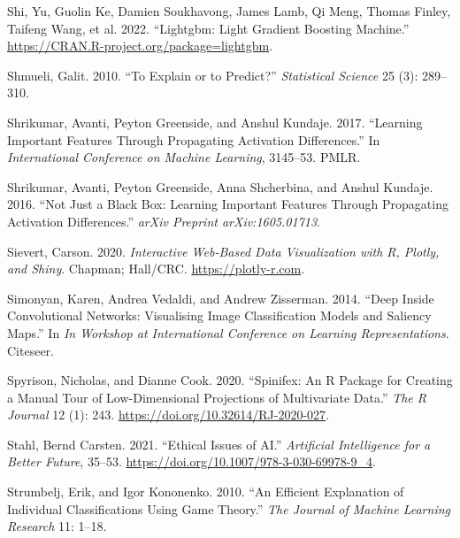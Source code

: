 \documentclass[
]{article}
\newlength{\cslhangindent}
\newlength{\cslentryspacingunit} %
\newenvironment{CSLReferences}[2] %
 {%
  \setlength{\parindent}{0pt}
  \ifodd #1
  \let\oldpar\par
  \def\par{\hangindent=\cslhangindent\oldpar}
  \fi
  \setlength{\parskip}{#2\cslentryspacingunit}
 }%
 {}
\begin{document}
\begin{CSLReferences}{1}{0}
\leavevmode{}%
Shi, Yu, Guolin Ke, Damien Soukhavong, James Lamb, Qi Meng, Thomas Finley, Taifeng Wang, et al. 2022. {``Lightgbm: {Light} {Gradient} {Boosting} {Machine}.''} \url{https://CRAN.R-project.org/package=lightgbm}.

\leavevmode{}%
Shmueli, Galit. 2010. {``To Explain or to Predict?''} \emph{Statistical Science} 25 (3): 289--310.

\leavevmode{}%
Shrikumar, Avanti, Peyton Greenside, and Anshul Kundaje. 2017. {``Learning Important Features Through Propagating Activation Differences.''} In \emph{International {Conference} on {Machine} {Learning}}, 3145--53. PMLR.

\leavevmode{}%
Shrikumar, Avanti, Peyton Greenside, Anna Shcherbina, and Anshul Kundaje. 2016. {``Not Just a Black Box: {Learning} Important Features Through Propagating Activation Differences.''} \emph{arXiv Preprint arXiv:1605.01713}.

\leavevmode{}%
Sievert, Carson. 2020. \emph{Interactive {Web}-{Based} {Data} {Visualization} with {R}, Plotly, and Shiny}. Chapman; Hall/CRC. \url{https://plotly-r.com}.

\leavevmode{}%
Simonyan, Karen, Andrea Vedaldi, and Andrew Zisserman. 2014. {``Deep Inside Convolutional Networks: {Visualising} Image Classification Models and Saliency Maps.''} In \emph{In {Workshop} at {International} {Conference} on {Learning} {Representations}}. Citeseer.

\leavevmode{}%
Spyrison, Nicholas, and Dianne Cook. 2020. {``Spinifex: An {R} {Package} for {Creating} a {Manual} {Tour} of {Low}-Dimensional {Projections} of {Multivariate} {Data}.''} \emph{The R Journal} 12 (1): 243. \url{https://doi.org/10.32614/RJ-2020-027}.

\leavevmode{}%
Stahl, Bernd Carsten. 2021. {``Ethical Issues of AI.''} \emph{Artificial Intelligence for a Better Future}, 35--53. \url{https://doi.org/10.1007/978-3-030-69978-9_4}.

\leavevmode{}%
Strumbelj, Erik, and Igor Kononenko. 2010. {``An Efficient Explanation of Individual Classifications Using Game Theory.''} \emph{The Journal of Machine Learning Research} 11: 1--18.


\end{CSLReferences}
\end{document}
